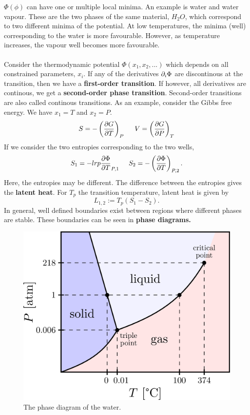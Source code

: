         $\Phi(\phi)$ can have one or multiple local minima. An example is water and water vapour. These are the two phases of the same material, $H_2O$, which correspond to two different minima of the potential. At low temperatures, the minima (well) corresponding to the water is more favourable. However, as temperature increases, the vapour well becomes more favourable.\\
        \\
        Consider the thermodynamic potential $\Phi(x_1,x_2,...)$ which depends on all constrained parameters, $x_i$. If any of the derivatives $\partial_i\Phi$ are discontinous at the transition, then we have a \textbf{first-order transition}. If however, all derivatives are continous, we get a \textbf{second-order phase transition}. Second-order transitions are also called continous transitions. As an example, consider the Gibbs free energy. We have $x_1 =T$ and $x_2=P$. 
        \begin{equation}
            S = - \left( \frac{\partial G}{\partial T} \right)_P \hspace{0.5cm} V = \left( \frac{\partial G}{\partial P} \right)_T
        \end{equation}
        If we consider the two entropies corresponding to the two wells,
        \begin{equation}
            S_1=-lrp{\frac{\partial \Phi}{\partial T}}_{P,1} \hspace*{0.5cm} S_2=-\left( \frac{\partial \Phi}{\partial T} \right)_{P,2}.
        \end{equation}
        Here, the entropies may be different. The difference between the entropies gives the \textbf{latent heat}. For $T_p$ the transition temperature, latent heat is given by
        \begin{equation}
            L_{1,2} := T_p(S_1-S_2).
        \end{equation}
        In general, well defined boundaries exist between regions where different phases are stable. These boundaries can be seen in \textbf{phase diagrams.}
        \begin{figure}[h!]
           \centering
           \includegraphics[width=0.5\linewidth]{phasediagram.png}
           \caption{The phase diagram of the water.}
           \label{fig:phasediagram}
        \end{figure}

